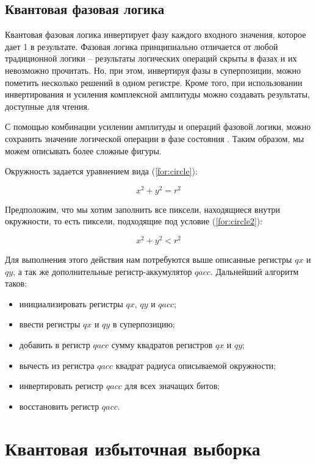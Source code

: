 \subsection{Квантовая фазовая логика}

Квантовая фазовая логика инвертирует фазу каждого входного значения, которое дает 1 в результате.
Фазовая логика принципиально отличается от любой традиционной логики -- результаты логических операций скрыты в фазах и их невозможно прочитать. Но, при этом, инвертируя фазы в суперпозиции, можно пометить несколько решений в одном регистре. Кроме того, при использовании инвертирования и усиления комплексной амплитуды можно создавать результаты, доступные для чтения.

С помощью комбинации усилении амплитуды и операций фазовой логики, можно сохранить значение логической операции в фазе состояния \cite{PQC}. Таким образом, мы можем описывать более сложные фигуры. 

Окружность задается уравнением вида (\ref{for:circle}):

\begin{equation}
\label{for:circle}
x^2 + y^2 = r^2
\end{equation}

Предположим, что мы хотим заполнить все пиксели, находящиеся внутри окружности, то есть пиксели, подходящие под условие (\ref{for:circle2}):

\begin{equation}
\label{for:circle2}
x^2 + y^2 < r^2
\end{equation}

Для выполнения этого действия нам потребуются выше описанные регистры $qx$ и $qy$, а так же дополнительные регистр-аккумулятор $qacc$. Дальнейший алгоритм таков:

\begin{itemize}
	\item инициализировать регистры $qx$, $qy$ и $qacc$;
	\item ввести регистры $qx$ и $qy$ в суперпозицию;
	\item добавить в регистр $qacc$ сумму квадратов регистров $qx$ и $qy$;
	\item вычесть из регистра $qacc$ квадрат радиуса описываемой окружности;
	\item инвертировать регистр $qacc$ для всех значащих битов;
	\item восстановить регистр $qacc$.
\end{itemize}

\section{Квантовая избыточная выборка}

